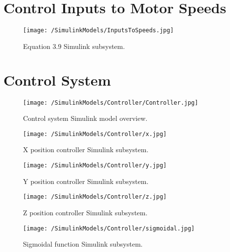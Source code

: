 \FloatBarrier
\clearpage
\section{Control Inputs to Motor Speeds}

\begin{figure}[htb]
\begin{center}
	\texttt{[image: /SimulinkModels/InputsToSpeeds.jpg]}%
	\end{center}
	\caption{Equation 3.9 Simulink subsystem.}%
\end{figure}
\FloatBarrier
\clearpage

\section{Control System}

\begin{figure}[htb]
\begin{center}
	\texttt{[image: /SimulinkModels/Controller/Controller.jpg]}%
	\end{center}
	\caption{Control system Simulink model overview.}%
\end{figure}

\begin{figure}[htb]
\begin{center}
	\texttt{[image: /SimulinkModels/Controller/x.jpg]}%
	\end{center}
	\caption{X position controller Simulink subsystem.}%
\end{figure}

\begin{figure}[htb]
\begin{center}
	\texttt{[image: /SimulinkModels/Controller/y.jpg]}%
	\end{center}
	\caption{Y position controller Simulink subsystem.}%
\end{figure}

\begin{figure}[htb]
\begin{center}
	\texttt{[image: /SimulinkModels/Controller/z.jpg]}%
	\end{center}
	\caption{Z position controller Simulink subsystem.}%
\end{figure}

\begin{figure}[htb]
\begin{center}
	\texttt{[image: /SimulinkModels/Controller/sigmoidal.jpg]}%
	\end{center}
	\caption{Sigmoidal function Simulink subsystem.}%
\end{figure}

